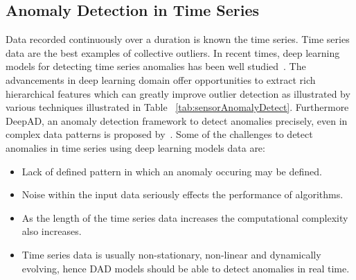 \subsection{Anomaly Detection in Time Series }
\label{sec:timeseriesAD}
Data recorded continuously over a duration is known the time series. Time series data are the best examples of collective outliers. In recent times, deep learning models for detecting time series anomalies has been well studied~\cite{fawaz2018deep,langkvist2014review,gamboa2017deep,lu2017unsupervised}. The advancements in deep learning domain offer opportunities to extract rich hierarchical features which can greatly improve outlier detection as illustrated by various techniques illustrated in Table ~\ref{tab:sensorAnomalyDetect}. Furthermore DeepAD, an anomaly detection framework to detect anomalies precisely, even in complex data patterns is proposed by~\cite{buda2018deepad}. Some of the challenges to detect anomalies in time series using deep learning models data are:
\begin{itemize}
    \item Lack of defined pattern in which an anomaly occuring may be defined.
    \item Noise within the input data seriously effects the performance of algorithms.
    \item As the length of the time series data increases the computational complexity also increases.
    \item Time series data is usually non-stationary, non-linear and dynamically evolving, hence DAD models should be able to detect anomalies in real time.
\end{itemize}


